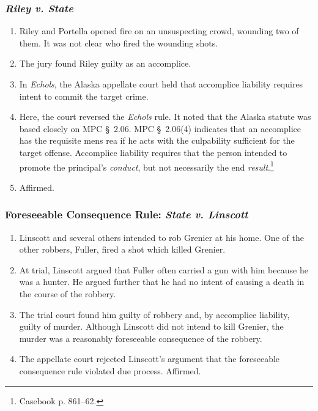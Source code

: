 \subsubsection{\emph{Riley v. State}}

\begin{enumerate}
    \item Riley and Portella opened fire on an unsuspecting crowd, wounding 
    two of them. It was not clear who fired the wounding shots.
    \item The jury found Riley guilty as an accomplice.
    \item In \emph{Echols}, the Alaska appellate court held that accomplice 
    liability requires intent to commit the target crime.
    \item Here, the court reversed the \emph{Echols} rule. It noted that the 
    Alaska statute was based closely on MPC \S\ 2.06. MPC \S\ 2.06(4) 
    indicates that an accomplice has the requisite mens rea if he acts with 
    the culpability sufficient for the target offense. Accomplice liability 
    requires that the person intended to promote the principal's 
    \emph{conduct}, but not necessarily the end 
    \emph{result}.\footnote{Casebook p. 861--62.}
    \item Affirmed.
\end{enumerate}

\subsubsection{Foreseeable Consequence Rule: \emph{State v. Linscott}}

\begin{enumerate}
    \item Linscott and several others intended to rob Grenier at his home. One 
    of the other robbers, Fuller, fired a shot which killed Grenier.
    \item At trial, Linscott argued that Fuller often carried a gun with him 
    because he was a hunter. He argued further that he had no intent of 
    causing a death in the course of the robbery.
    \item The trial court found him guilty of robbery and, by accomplice 
    liability, guilty of murder. Although Linscott did not intend to kill 
    Grenier, the murder was a reasonably foreseeable consequence of the 
    robbery.
    \item The appellate court rejected Linscott's argument that the 
    foreseeable consequence rule violated due process. Affirmed.
\end{enumerate}

